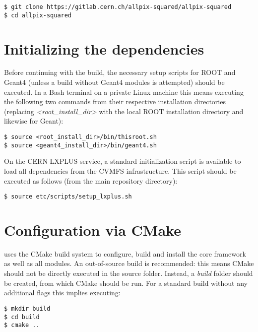\begin{verbatim}
$ git clone https://gitlab.cern.ch/allpix-squared/allpix-squared
$ cd allpix-squared
\end{verbatim}

\section{Initializing the dependencies}
\label{sec:initialize_dependencies}
Before continuing with the build, the necessary setup scripts for ROOT and Geant4 (unless a build without Geant4 modules is attempted) should be executed.
In a Bash terminal on a private Linux machine this means executing the following two commands from their respective installation directories (replacing \textit{\textless root\_install\_dir\textgreater} with the local ROOT installation directory and likewise for Geant):
\begin{verbatim}
$ source <root_install_dir>/bin/thisroot.sh
$ source <geant4_install_dir>/bin/geant4.sh
\end{verbatim}

On the CERN LXPLUS service, a standard initialization script is available to load all dependencies from the CVMFS infrastructure.
This script should be executed as follows (from the main repository directory):
\begin{verbatim}
$ source etc/scripts/setup_lxplus.sh
\end{verbatim}

\section{Configuration via CMake}
\label{sec:cmake_config}
\apsq uses the CMake build system to configure, build and install the core framework as well as all modules.
An out-of-source build is recommended: this means CMake should not be directly executed in the source folder.
Instead, a \textit{build} folder should be created, from which CMake should be run.
For a standard build without any additional flags this implies executing:

\begin{verbatim}
$ mkdir build
$ cd build
$ cmake ..
\end{verbatim}

